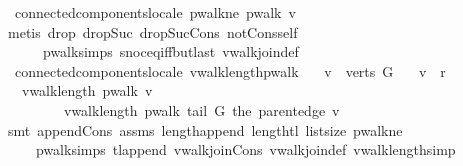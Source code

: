 \begin{isabellebody}
\endisatagproof
{\isafoldproof}%
%
\isadelimproof
\isanewline
%
\endisadelimproof
\isanewline
{}\isamarkupfalse%
\ {\isacharparenleft}\ connected{\isacharunderscore}components{\isacharunderscore}locale{\isacharparenright}\ pwalk{\isacharunderscore}ne{\isacharcolon}\ {\isachardoublequoteopen}pwalk\ v\ {\isasymnoteq}\ {\isacharbrackleft}{\isacharbrackright}{\isachardoublequoteclose}\ \isanewline
%
\isadelimproof
\ \ %
\endisadelimproof
%
\isatagproof
{}\isamarkupfalse%
\ {\isacharparenleft}metis\ drop{\isacharunderscore}{}\ drop{\isacharunderscore}Suc\ drop{\isacharunderscore}Suc{\isacharunderscore}Cons\ not{\isacharunderscore}Cons{\isacharunderscore}self\isanewline
\ \ \ \ \ \ pwalk{\isachardot}simps\ snoc{\isacharunderscore}eq{\isacharunderscore}iff{\isacharunderscore}butlast\ vwalk{\isacharunderscore}join{\isacharunderscore}def{\isacharparenright}%
\endisatagproof
{\isafoldproof}%
%
\isadelimproof
\isanewline
%
\endisadelimproof
\isanewline
{}\isamarkupfalse%
\ {\isacharparenleft}\ connected{\isacharunderscore}components{\isacharunderscore}locale{\isacharparenright}\ vwalk{\isacharunderscore}length{\isacharunderscore}pwalk{\isacharcolon}\isanewline
\ \ \ {\isachardoublequoteopen}v\ {\isasymin}\ verts\ G{\isachardoublequoteclose}\isanewline
\ \ \ {\isachardoublequoteopen}v\ {\isasymnoteq}\ r{\isachardoublequoteclose}\isanewline
\ \ \ {\isachardoublequoteopen}vwalk{\isacharunderscore}length\ {\isacharparenleft}pwalk\ v{\isacharparenright}\ {\isacharequal}\ \isanewline
\ \ \ \ \ \ \ \ \ vwalk{\isacharunderscore}length\ {\isacharparenleft}pwalk\ {\isacharparenleft}tail\ G\ {\isacharparenleft}the\ {\isacharparenleft}parent{\isacharunderscore}edge\ v{\isacharparenright}{\isacharparenright}{\isacharparenright}{\isacharparenright}\ {\isacharplus}\ {}{\isachardoublequoteclose}\isanewline
%
\isadelimproof
\ \ %
\endisadelimproof
%
\isatagproof
{}\isamarkupfalse%
\ {\isacharparenleft}smt\ append{\isacharunderscore}Cons\ assms\ length{\isacharunderscore}append\ length{\isacharunderscore}tl\ list{\isachardot}size{\isacharparenleft}{}{\isacharcomma}{}{\isacharparenright}\ pwalk{\isacharunderscore}ne\isanewline
\ \ \ \ \ pwalk{\isachardot}simps\ tl{\isacharunderscore}append{}\ vwalk{\isacharunderscore}join{\isacharunderscore}Cons\ vwalk{\isacharunderscore}join{\isacharunderscore}def\ vwalk{\isacharunderscore}length{\isacharunderscore}simp{\isacharparenright}%
\endisatagproof

\end{isabellebody}
